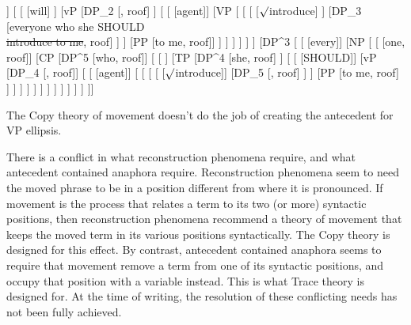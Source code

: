 \medskip
\begin{fullwidth}
	\begin{exe}
	\ex \label{ex6:acdcopy1a}
	\footnotesize
	\begin{forest}
	[TP
		[TP
			[DP^2 [she, roof]]
			[ 
				[ [will] ]
				[vP
					[DP_2 [, roof] ]
					[
						[ [agent]]
						[VP [
							[
							[ [$\surd$introduce] ]
							[DP_3 [everyone who she SHOULD\\ \sout{introduce to me}, roof] ]
							]
							[PP [to me, roof]]
						] ]
					 ]
				 ]
			]
		 ]
		[DP^3 [
			[ [every]]
			[NP [
				[]
				[CP 
				[DP^5 [who, roof]]
				[
					[ ]
					[TP 
						[DP^4 [she, roof] ]
						[
							[ [SHOULD]]
							[vP
								[DP_4 [, roof]]
								[
								[ [agent]]
								[ [
									[ 
										[ [$\surd$introduce]]
										[DP_5 [, roof] ]
									]
									[PP [to me, roof] ]
								] ]
							 ]
						 ]
					 ]
				] ]
			] ]
		] ]
	]]
	\end{forest}%
\end{exe}
\end{fullwidth}
\medskip
The Copy theory of movement doesn't do the job of creating the antecedent for VP ellipsis. 

There is a conflict in what reconstruction phenomena require, and what antecedent contained anaphora require. Reconstruction phenomena seem to need the moved phrase to be in a position different from where it is pronounced. If movement is the process that relates a term to its two (or more) syntactic positions, then reconstruction phenomena recommend a theory of movement that keeps the moved term in its various positions syntactically. The Copy theory is designed for this effect. By contrast, antecedent contained anaphora seems to require that movement remove a term from one of its syntactic positions, and occupy that position with a variable instead. This is what Trace theory is designed for. At the time of writing, the resolution of these conflicting needs has not been fully achieved.


